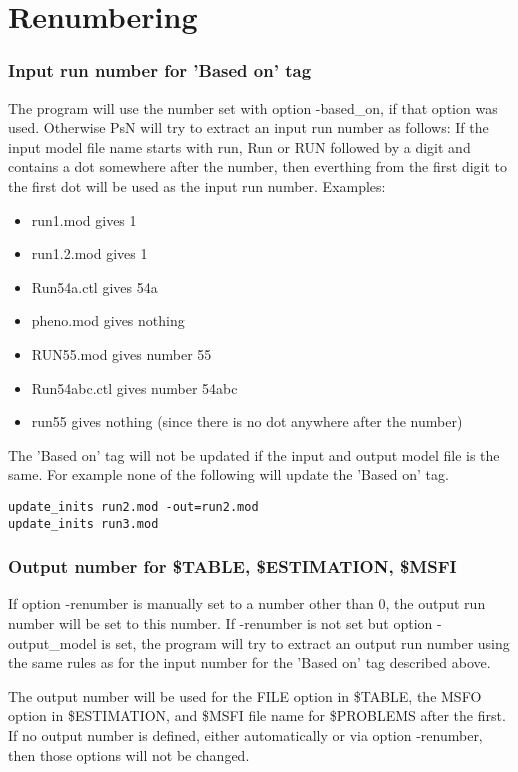 \section{Renumbering}
\subsubsection*{Input run number for 'Based on' tag}
The program will use the number set with option -based\_on, if that option was used.
Otherwise PsN will try to extract an input run number as follows: If the input model file name
starts with run, Run or RUN followed by a digit and contains a dot 
somewhere after the number, then everthing from the first digit to the first dot will be used as the input run number. Examples:
\begin{itemize}
\item run1.mod gives 1
\item run1.2.mod gives 1
\item Run54a.ctl gives 54a
\item pheno.mod gives nothing
\item RUN55.mod gives number 55
\item Run54abc.ctl gives number 54abc
\item run55 gives nothing (since there is no dot anywhere after the number)
\end{itemize}

The 'Based on' tag will not be updated if the input and output model file is the same. For example none of the following will update the 'Based on' tag.
\begin{verbatim}
update_inits run2.mod -out=run2.mod
update_inits run3.mod
\end{verbatim}


\subsubsection*{Output number for \$TABLE, \$ESTIMATION, \$MSFI}
If option -renumber is manually set to a number other than 0, the output run number will
be set to this number. If -renumber is not set but option -output\_model is set,
the program will try to extract an output run number using the same rules
as for the input number for the 'Based on' tag described above.

The output number will be used for the FILE option in \$TABLE, the MSFO option in
\$ESTIMATION, and \$MSFI file name for \$PROBLEMS after the first. 
If no output number is defined, either automatically or via option -renumber, 
then those options will not be changed.

